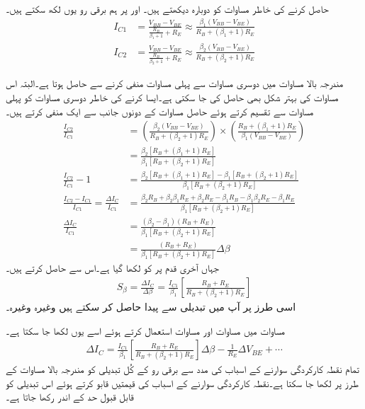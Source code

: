   حاصل کرنے کی خاطر مساوات   کو دوبارہ دیکھتے ہیں۔  اور  پر ہم برقی رو یوں لکھ سکتے ہیں۔
\begin{align}
I_{C1}&=\frac{V_{BB}-V_{BE}}{\frac{R_B}{\beta_1+1}+R_E} \approx \frac{\beta_1 \left (V_{BB}-V_{BE} \right )}{R_B+\left (\beta_1+1 \right ) R_E}\\
I_{C2}&=\frac{V_{BB}-V_{BE}}{\frac{R_B}{\beta_2+1}+R_E} \approx \frac{\beta_2 \left (V_{BB}-V_{BE} \right )}{R_B+\left (\beta_2+1 \right ) R_E}
\end{align}

مندرجہ بالا مساوات میں دوسری مساوات سے پہلی مساوات منفی کرنے سے  حاصل ہوتا ہے۔البتہ اس مساوات کی بہتر شکل بھی حاصل کی جا سکتی ہے۔ایسا کرنے کی خاطر دوسری مساوات کو پہلی مساوات سے تقسیم کرتے ہوئے حاصل مساوات کے دونوں جانب سے ایک   منفی کرتے ہیں۔
\begin{align*}
\frac{I_{C2}}{I_{C1}}&=\left (\frac{\beta_2 (V_{BB}-V_{BE})}{R_B+(\beta_2+1)R_E} \right ) \times \left (\frac{R_B+(\beta_1+1)R_E}{\beta_1  (V_{BB}-V_{BE})} \right ) \\
&=\frac{\beta_2 [R_B+(\beta_1+1)R_E]}{\beta_1[R_B+(\beta_2+1)R_E]}\\
\frac{I_{C2}}{I_{C1}} -1 &=\frac{\beta_2 [R_B+(\beta_1 +1)R_E]-\beta_1 [R_B+(\beta_2+1)R_E]}{\beta_1[R_B+(\beta_2+1)R_E]}\\
\frac{I_{C2}-I_{C1}}{I_{C1}}=\frac{\Delta I_C}{I_{C1}}&=\frac{\beta_2 R_B +\beta_2 \beta_1 R_E + \beta_2 R_E-\beta_1 R_B-\beta_1 \beta_2 R_E-\beta_1 R_E}{\beta_1[R_B+(\beta_2+1)R_E]}\\
\frac{\Delta I_C}{I_{C1}}&=\frac{\left (\beta_2-\beta_1 \right ) \left (R_B+R_E \right )}{\beta_1 [R_B +(\beta_2+1)R_E]}\\
&=\frac{ \left (R_B+R_E \right )}{\beta_1 [R_B +(\beta_2+1)R_E]} \Delta \beta
\end{align*}
جہاں آخری قدم پر  کو  لکھا گیا ہے۔اس سے  حاصل کرتے ہیں۔
\begin{align}\label{مساوات_ٹرانزسٹر_بیٹا_اسباب}
S_{\beta}=\frac{\Delta I_C}{\Delta \beta}=\frac{I_{C1}}{\beta_1} \left [\frac{R_B+R_E}{R_B+\left (\beta_2+1 \right )R_E} \right ]
\end{align}
اسی طرز پر آپ  میں تبدیلی سے پیدا  حاصل کر سکتے ہیں وغیرہ وغیرہ۔

مساوات  میں مساوات  اور مساوات  استعمال کرتے ہوئے اسے یوں لکھا جا سکتا ہے۔
\begin{align}\label{مساوات_ٹرانزسٹر_اسباب_سوارنے_کی_مساوات}
\Delta I_C = \frac{I_{C1}}{\beta_1} \left [\frac{R_B+R_E}{R_B+\left (\beta_2+1 \right )R_E} \right ] \Delta \beta-\frac{1}{R_E} \Delta V_{BE} +\cdots
\end{align}
تمام نقطہ کارکردگی سوارنے کے اسباب کی مدد سے برقی رو   کے کُل تبدیلی کو مندرجہ بالا مساوات کے طرز پر لکھا جا سکتا ہے۔نقطہ کارکردگی سوارنے کے اسباب کی قیمتیں قابو کرتے ہوئے اس تبدیلی کو قابل قبول حد کے اندر رکھا جاتا ہے۔

